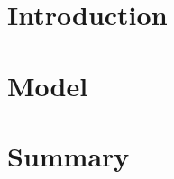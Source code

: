 \documentclass{physics_article_B}
\date{\today}
\begin{document}
\maketitle

\begin{abstract}
  \lipsum[2]
\end{abstract}

\section{Introduction}
\section{Model}
\section{Summary}

\printbibliography
\end{document}
